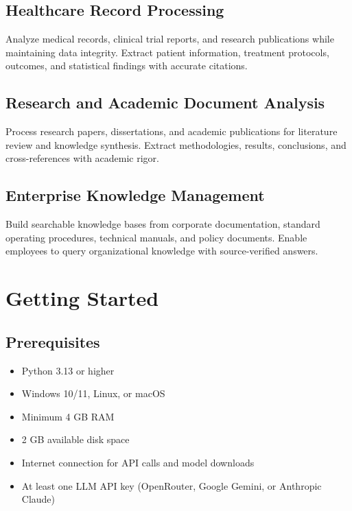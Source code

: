 \documentclass[11pt,a4paper]{article}
\begin{document}
\subsection{Healthcare Record Processing}

Analyze medical records, clinical trial reports, and research publications while maintaining data integrity. Extract patient information, treatment protocols, outcomes, and statistical findings with accurate citations.

\subsection{Research and Academic Document Analysis}

Process research papers, dissertations, and academic publications for literature review and knowledge synthesis. Extract methodologies, results, conclusions, and cross-references with academic rigor.

\subsection{Enterprise Knowledge Management}

Build searchable knowledge bases from corporate documentation, standard operating procedures, technical manuals, and policy documents. Enable employees to query organizational knowledge with source-verified answers.

\clearpage
\section{Getting Started}

\subsection{Prerequisites}

\begin{itemize}[leftmargin=*]
    \item Python 3.13 or higher
    \item Windows 10/11, Linux, or macOS
    \item Minimum 4 GB RAM
    \item 2 GB available disk space
    \item Internet connection for API calls and model downloads
    \item At least one LLM API key (OpenRouter, Google Gemini, or Anthropic Claude)
\end{itemize}
\end{document}
